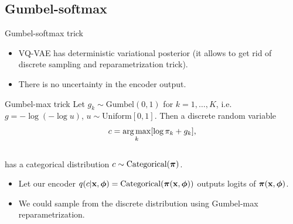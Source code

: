 \subsection{Gumbel-softmax}
\begin{frame}{Gumbel-softmax trick}
	\begin{itemize}
		\item VQ-VAE has deterministic variational posterior (it allows to get rid of discrete sampling and reparametrization trick).
		\item There is no uncertainty in the encoder output. 
	\end{itemize}
	\vspace{-0.2cm}
	\begin{block}{Gumbel-max trick}
		Let $g_k \sim \text{Gumbel}(0, 1)$ for $k = 1, \dots, K$, i.e. $g = - \log (- \log u)$, $u \sim \text{Uniform}[0, 1]$. Then a discrete random variable
		\vspace{-0.2cm}
		\[
			c = \operatorname*{arg\,max}_k [\log \pi_k + g_k],
		\]
		\vspace{-0.5cm} \\
		has a categorical distribution $c \sim \text{Categorical}(\boldsymbol{\pi})$.
	\end{block}
	\begin{itemize}
		\item Let our encoder $q(c | \mathbf{x}, \boldsymbol{\phi}) = \text{Categorical}(\boldsymbol{\pi}(\mathbf{x}, \boldsymbol{\phi}))$ outputs logits of $\boldsymbol{\pi}(\mathbf{x}, \boldsymbol{\phi})$.
		\item We could sample from the discrete distribution using Gumbel-max reparametrization.
	\end{itemize}

\end{frame}
